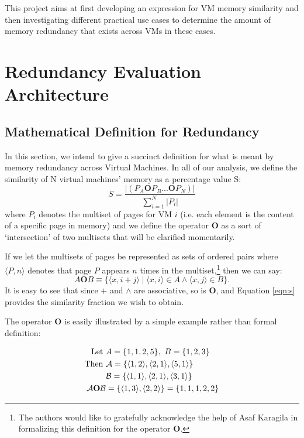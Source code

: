 \documentclass{acm_proc_article-sp}
\newcommand{\tup}[1]{\langle #1\rangle}
\begin{document}
This project aims at first developing an expression for VM memory similarity and then investigating different practical use cases to determine the amount of memory redundancy that exists across VMs in these cases. 

\section{Redundancy Evaluation Architecture}\label{sec:redundancy}

\subsection{Mathematical Definition for Redundancy}\label{sec:red_math}
In this section, we intend to give a succinct definition for what is meant by memory redundancy across Virtual Machines.  In all of our analysis, we define the similarity of N virtual machines' memory as a percentage value S:
\begin{equation}
S = \frac{|(P_A \mathbf{O} P_B ... \mathbf{O} P_N)|}{\sum\limits_{i=1}^{N}|P_i|}
\end{equation}\label{eqn:s}
where $P_i$ denotes the multiset of pages for VM $i$ (i.e. each element is the content of a specific page in memory) and we define the operator $\mathbf{O}$ as a sort of `intersection' of two multisets that will be clarified momentarily.  



If we let the multisets of pages be represented as sets of ordered pairs where $\tup{P,n}$ denotes that page $P$ appears $n$ times in the multiset,\footnote{The authors would like to gratefully acknowledge the help of Asaf Karagila in formalizing this definition for the operator $\mathbf{O}$.}
then we can say:
\begin{equation}\label{eqn:s}
A\mathrel{\mathbf{O}}B\equiv\{\tup{x,i+j}\mid\tup{x,i}\in A\land\tup{x,j}\in B\}.
\end{equation}
It is easy to see that since $+$ and $\land$ are associative, so is $\mathbf{O}$, and Equation \ref{eqn:s} provides the similarity fraction we wish to obtain.

The operator $\mathbf{O}$ is easily illustrated by a simple example rather than formal definition:

\begin{align*}
\textrm{Let } & A = \{1,1,2,5\},~B = \{1,2,3\}\\
\textrm{Then } &{\cal A} = \{\tup{1,2}, \tup{2,1}, \tup{5,1}\}\\
& {\cal B} = \{\tup{1,1}, \tup{2,1}, \tup{3,1}\}\\
{\cal A} \mathbf{O} {\cal B} &= \{\tup{1,3}, \tup{2,2}\} = \{1,1,1,2,2\}
\end{align*}
\end{document}
